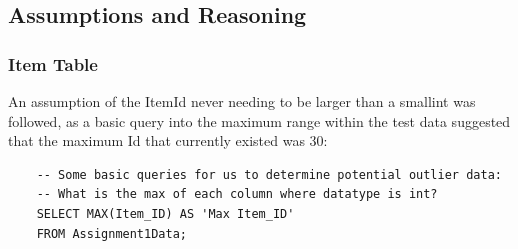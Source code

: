 \documentclass{article}
\begin{document}
        \subsection{Assumptions and Reasoning}
            \subsubsection{Item Table}
                An assumption of the ItemId never needing to be larger than a smallint
                was followed, as a basic query into the maximum range within the test data
                suggested that the maximum Id that currently existed was 30:
                \begin{verbatim}
    -- Some basic queries for us to determine potential outlier data:
    -- What is the max of each column where datatype is int?
    SELECT MAX(Item_ID) AS 'Max Item_ID'
    FROM Assignment1Data;
                \end{verbatim}
\end{document}

